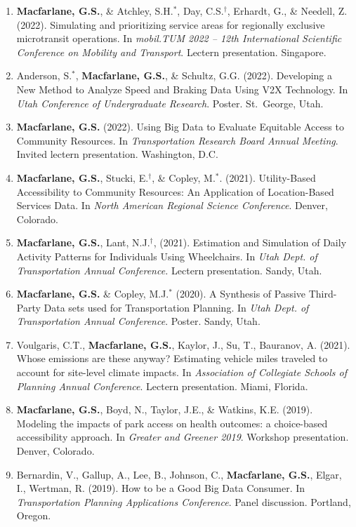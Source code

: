 \documentclass[margin,line]{res}
\newcounter{enuminitialize}
\newenvironment{myenum}[1][]
{%
 \setcounter{enuminitialize}{#1}
 \addtocounter{enuminitialize}{2}
 \begin{enumerate}[left= 4pt, itemsep=8pt, start=\value{enuminitialize}, label=\arabic*\addtocounter{enumi}{-2}]
}
{%
 \end{enumerate}
}
\begin{document}
\begin{resume}
\begin{myenum}[45]
\item \textbf{Macfarlane, G.S.}, \& Atchley, S.H.$^*$, Day, C.S.$^\dagger$, Erhardt, G., \& Needell, Z. (2022). Simulating and prioritizing service areas for regionally exclusive microtransit operations. In \textit{mobil.TUM 2022 – 12th International Scientific Conference on Mobility and Transport}. Lectern presentation. Singapore.
\item Anderson, S.$^*$, \textbf{Macfarlane, G.S.}, \& Schultz, G.G. (2022). Developing a New Method to Analyze Speed and Braking Data Using V2X Technology. In \textit{Utah Conference of Undergraduate Research}. Poster. St.\ George, Utah.
\item \textbf{Macfarlane, G.S.} (2022). Using Big Data to Evaluate Equitable Access to Community Resources. In \textit{Transportation Research Board Annual Meeting}. Invited lectern presentation. Washington, D.C.
\item \textbf{Macfarlane, G.S.}, Stucki,  E.$^\dagger$,  \& Copley, M.$^*$. (2021). Utility-Based Accessibility to Community Resources: An Application of Location-Based Services Data. In \textit{North American Regional Science Conference}. Denver, Colorado.
\item \textbf{Macfarlane, G.S.}, Lant, N.J.$^\dagger$, (2021). Estimation and Simulation of Daily Activity Patterns for Individuals Using Wheelchairs. In \textit{Utah Dept. of Transportation Annual Conference.} Lectern presentation. Sandy, Utah.
\item \textbf{Macfarlane, G.S.} \& Copley, M.J.$^*$ (2020).  A Synthesis of Passive Third-Party Data sets used for Transportation Planning. In \textit{Utah Dept. of Transportation Annual Conference}. Poster. Sandy, Utah.
\item Voulgaris, C.T., \textbf{Macfarlane, G.S.}, Kaylor, J., Su, T., Bauranov, A. (2021). Whose emissions are these anyway? Estimating vehicle miles traveled to account for site-level climate impacts. In \textit{Association of Collegiate Schools of Planning Annual Conference}. Lectern presentation. Miami, Florida.
\item \textbf{Macfarlane, G.S.}, Boyd, N., Taylor, J.E., \& Watkins, K.E. (2019). Modeling the impacts of park access on health outcomes: a choice-based accessibility approach. In \textit{Greater and Greener 2019}. Workshop presentation. Denver, Colorado.
\item Bernardin, V., Gallup, A., Lee, B., Johnson, C., \textbf{Macfarlane, G.S.}, Elgar, I., Wertman, R. (2019). How to be a Good Big Data Consumer. In \textit{Transportation Planning Applications Conference}. Panel discussion. Portland, Oregon.

\end{myenum}
\end{resume}
\end{document}
